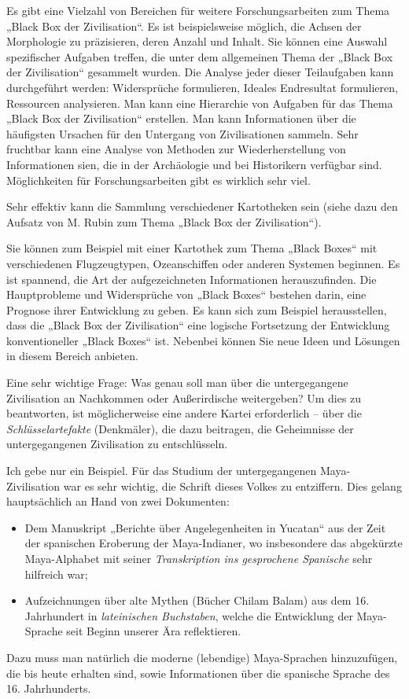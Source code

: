 \documentclass[11pt,a4paper]{article}
\begin{document}
Es gibt eine Vielzahl von Bereichen für weitere Forschungsarbeiten zum Thema
„Black Box der Zivilisation“. Es ist beispielsweise möglich, die Achsen der
Morphologie zu präzisieren, deren Anzahl und Inhalt. Sie können eine Auswahl
spezifischer Aufgaben treffen, die unter dem allgemeinen Thema der „Black Box
der Zivilisation“ gesammelt wurden. Die Analyse jeder dieser Teilaufgaben kann
durchgeführt werden: Widersprüche formulieren, Ideales Endresultat
formulieren, Ressourcen analysieren.  Man kann eine Hierarchie von Aufgaben
für das Thema „Black Box der Zivilisation“ erstellen. Man kann Informationen
über die häufigsten Ursachen für den Untergang von Zivilisationen
sammeln. Sehr fruchtbar kann eine Analyse von Methoden zur Wiederherstellung
von Informationen sien, die in der Archäologie und bei Historikern verfügbar
sind.  Möglichkeiten für Forschungsarbeiten gibt es wirklich sehr viel.

Sehr effektiv kann die Sammlung verschiedener Kartotheken sein (siehe dazu den
Aufsatz \cite{RubinXX} von M. Rubin zum Thema „Black Box der Zivilisation“).

Sie können zum Beispiel mit einer Kartothek zum Thema „Black Boxes“ mit
verschiedenen Flugzeugtypen, Ozeanschiffen oder anderen Systemen beginnen. Es
ist spannend, die Art der aufgezeichneten Informationen herauszufinden. Die
Hauptprobleme und Widersprüche von „Black Boxes“ bestehen darin, eine Prognose
ihrer Entwicklung zu geben. Es kann sich zum Beispiel herausstellen, dass die
„Black Box der Zivilisation“ eine logische Fortsetzung der Entwicklung
konventioneller „Black Boxes“ ist. Nebenbei können Sie neue Ideen und Lösungen
in diesem Bereich anbieten.

Eine sehr wichtige Frage: Was genau soll man über die untergegangene
Zivilisation an Nachkommen oder Außerirdische weitergeben? Um dies zu
beantworten, ist möglicherweise eine andere Kartei erforderlich -- über die
\emph{Schlüsselartefakte} (Denkmäler), die dazu beitragen, die Geheimnisse der
untergegangenen Zivilisation zu entschlüsseln.

Ich gebe nur ein Beispiel. Für das Studium der untergegangenen
Maya-Zivilisation war es sehr wichtig, die Schrift dieses Volkes zu
entziffern.  Dies gelang hauptsächlich an Hand von zwei
Dokumenten: 
\begin{itemize}
\item Dem Manuskript „Berichte über Angelegenheiten in Yucatan“ aus der Zeit
  der spanischen Eroberung der Maya-Indianer, wo insbesondere das abgekürzte
  Maya-Alphabet mit seiner \emph{Transkription ins gesprochene Spanische} sehr
  hilfreich war;
\item Aufzeichnungen über alte Mythen (Bücher Chilam Balam) aus dem
  16. Jahrhundert in \emph{lateinischen Buchstaben}, welche die Entwicklung
  der Maya-Sprache seit Beginn unserer Ära reflektieren.
\end{itemize}
Dazu muss man natürlich die moderne (lebendige) Maya-Sprachen hinzuzufügen,
die bis heute erhalten sind, sowie Informationen über die spanische Sprache
des 16. Jahrhunderts.
\end{document}
